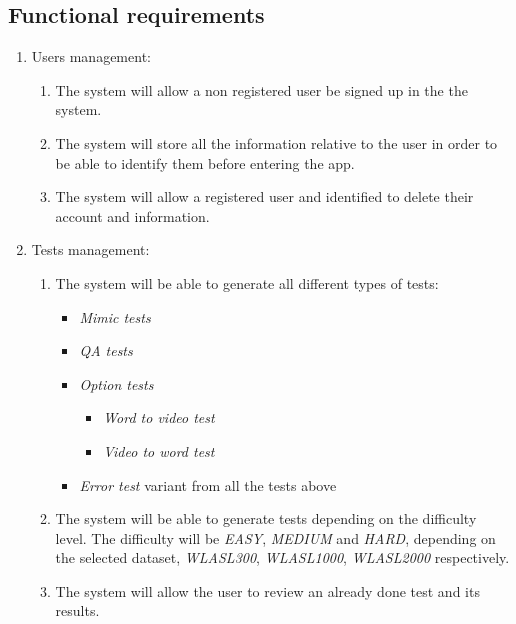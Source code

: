 \subsection{Functional requirements}
\begin{enumerate}[label=\textbf{RF\_\arabic*}, align=left, leftmargin=*]
    \item Users management:
        \begin{enumerate}[label=\textbf{\theenumi.\arabic*}, align=left, leftmargin=*]
            \item The system will allow a non registered user be signed up in the the system.
            \item The system will store all the information relative to the user in order to be able to identify them before entering the app.
            \item The system will allow a registered user and identified to delete their account and information.
        \end{enumerate}
    \item Tests management: 
        \begin{enumerate}[label=\textbf{\theenumi.\arabic*}, align=left, leftmargin=*]
            \item The system will be able to generate all different types of tests:
                \begin{itemize}
                    \item \textit{Mimic tests}
                    \item \textit{QA tests}
                    \item \textit{Option tests}
                        \begin{itemize}
                            \item \textit{Word to video test}
                            \item \textit{Video to word test}
                        \end{itemize}
                    \item \textit{Error test} variant from all the tests above
                \end{itemize}
            \item The system will be able to generate tests depending on the difficulty level. The difficulty will be \textit{EASY}, \textit{MEDIUM} and \textit{HARD}, depending on the selected dataset, \textit{WLASL300},  \textit{WLASL1000},  \textit{WLASL2000} respectively.
            \item The system will allow the user to review an already done test and its results.

\end{enumerate}
\end{enumerate}
